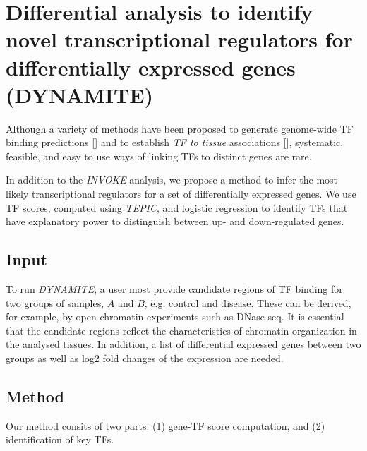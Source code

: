 \documentclass{article}
\begin{document}
\newpage
\section{Differential analysis to identify novel transcriptional regulators for differentially expressed genes (DYNAMITE)}
Although a variety of methods have been proposed to generate genome-wide TF binding predictions [\cite{pmid27899623,pmid22072382,pmid23424114,pmid25086003}] and to establish \textit{TF to tissue} 
associations [\cite{pmid22955983,pmid19995984,pmid27899623}], systematic, feasible, and easy to use ways of linking TFs to distinct genes are rare. 

In addition to the \textit{INVOKE} analysis, we propose a method to infer the most likely transcriptional regulators for a set of differentially expressed genes. 
We use TF scores, computed using \textit{TEPIC}, and logistic regression to identify TFs that have explanatory power to distinguish between up- and down-regulated genes. 

\subsection{Input}
To run \textit{DYNAMITE}, a user most provide candidate regions of TF binding for two groups of samples, $A$ and $B$, e.g. control and disease. 
These can be derived, for example, by open chromatin experiments such as DNase-seq. 
It is essential that the candidate regions reflect the characteristics of chromatin organization in the analysed tissues. 
In addition, a list of differential expressed genes between two groups as well as log2 fold changes of the expression are needed. 

\subsection{Method}
Our method consits of two parts: (1) gene-TF score computation, and (2) identification of key TFs. 
\end{document}
